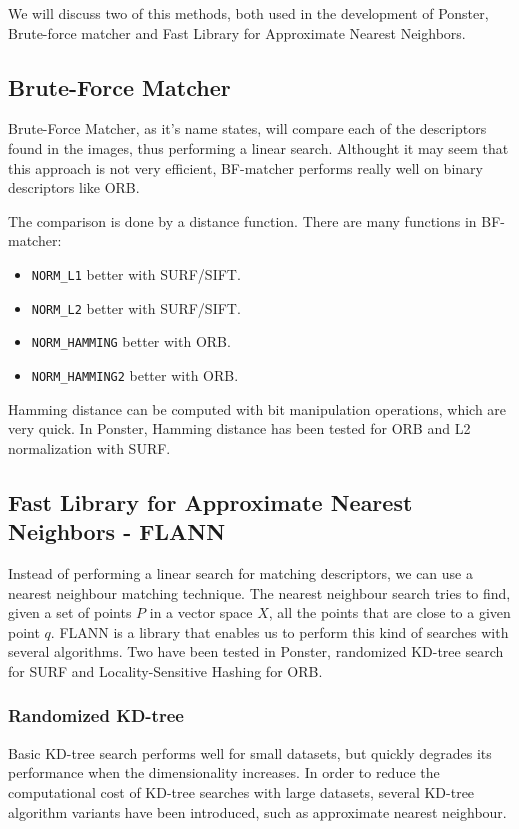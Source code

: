 We will discuss two of this methods, both used in the development of Ponster,
Brute-force matcher and Fast Library for Approximate Nearest Neighbors. 

\subsection{Brute-Force Matcher}
Brute-Force Matcher, as it's name states, will compare each of the descriptors
found in the images, thus performing a linear search. Althought it may seem that
this approach is not very efficient, BF-matcher performs really well on binary
descriptors like ORB. 

The comparison is done by a distance function. There are many functions in
BF-matcher:
\begin{itemize}
\item \texttt{NORM\_L1} better with SURF/SIFT.
\item \texttt{NORM\_L2} better with SURF/SIFT.
\item \texttt{NORM\_HAMMING} better with ORB.
\item \texttt{NORM\_HAMMING2} better with ORB.
\end{itemize}
Hamming distance can be computed with bit manipulation operations, which are
very quick. In Ponster, Hamming distance has been tested for ORB and L2
normalization with SURF. 

\subsection{Fast Library for Approximate Nearest Neighbors - FLANN}
Instead of performing a linear search for matching descriptors, we can use a
nearest neighbour matching technique. The nearest neighbour search tries to
find, given a set of points $P$ in a vector space $X$, all the points that are 
close to a given point $q$. FLANN\cite{muja:fast}
is a library that enables us to perform this
kind of searches with several algorithms. Two have been tested in Ponster,
randomized KD-tree search for SURF and Locality-Sensitive Hashing for ORB.

\subsubsection{Randomized KD-tree}
Basic KD-tree search performs well for small datasets, but quickly degrades
its performance when the dimensionality increases. In order
to reduce the computational cost of KD-tree searches with large datasets, several
KD-tree algorithm variants have been introduced, such as approximate nearest
neighbour. 

